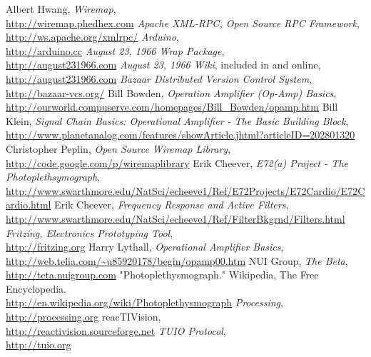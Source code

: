 \begin{thebibliography}{99}%
Albert Hwang, \textsl{Wiremap},
\\ \mbox{}\hfill\url{http://wiremap.phedhex.com}
\textsl{Apache XML-RPC, Open Source RPC Framework},
\\ \mbox{}\hfill\url{http://ws.apache.org/xmlrpc/}
\textsl{Arduino},
\\ \mbox{}\hfill\url{http://arduino.cc}
\textsl{August 23, 1966 Wrap Package},
\\ \mbox{}\hfill\url{http://august231966.com}
\textsl{August 23, 1966 Wiki}, included in \cite{PACK} and online,
\\ \mbox{}\hfill\url{http://august231966.com}
\textsl{Bazaar Distributed Version Control System},
\\ \mbox{}\hfill\url{http://bazaar-vcs.org/}
Bill Bowden, \textsl{Operation Amplifier (Op-Amp) Basics},
\\ \mbox{}\hfill\url{http://ourworld.compuserve.com/homepages/Bill\_Bowden/opamp.htm}
Bill Klein, \textsl{Signal Chain Basics: Operational Amplifier - The Basic Building Block},
\\ \mbox{}\hfill\url{http://www.planetanalog.com/features/showArticle.jhtml?articleID=202801320}
Christopher Peplin, \textsl{Open Source Wiremap Library},
\\ \mbox{}\hfill\url{http://code.google.com/p/wiremaplibrary}
Erik Cheever, \textsl{E72(a) Project - The Photoplethsymograph},
\\ \mbox{}\hfill\url{http://www.swarthmore.edu/NatSci/echeeve1/Ref/E72Projects/E72Cardio/E72Cardio.html}
Erik Cheever, \textsl{Frequency Response and Active Filters},
\\ \mbox{}\hfill\url{http://www.swarthmore.edu/NatSci/echeeve1/Ref/FilterBkgrnd/Filters.html}
\textsl{Fritzing, Electronics Prototyping Tool},
\\ \mbox{}\hfill\url{http://fritzing.org}
Harry Lythall, \textsl{Operational Amplifier Basics},
\\ \mbox{}\hfill\url{http://web.telia.com/~u85920178/begin/opamp00.htm}
NUI Group, \textsl{The Beta},
\\ \mbox{}\hfill\url{http://teta.nuigroup.com}
"Photoplethysmograph." Wikipedia, The Free Encyclopedia.
\\ \mbox{}\hfill\url{http://en.wikipedia.org/wiki/Photoplethysmograph}
\textsl{Processing}, 
\\ \mbox{}\hfill\url{http://processing.org}
reacTIVision,
\\ \mbox{}\hfill\url{http://reactivision.sourceforge.net}
\textsl{TUIO Protocol},
\\ \mbox{}\hfill\url{http://tuio.org}
\end{thebibliography}
